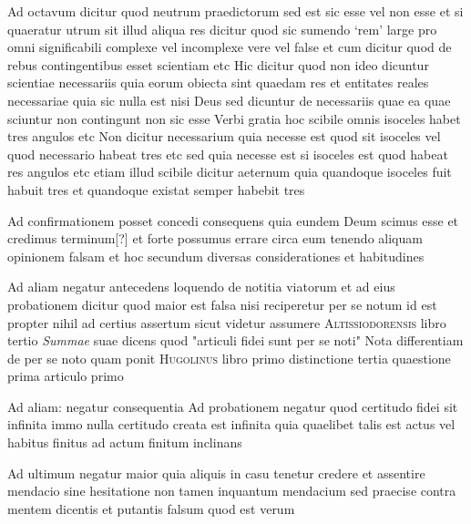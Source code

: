 \documentclass[twoside, openright]{article}
\newcommand{\name}[1]{\textsc{#1}}
\newcommand{\worktitle}[1]{\textit{#1}}
\begin{document}
        \pstart
        Ad octavum dicitur quod neutrum praedictorum sed est sic esse vel non esse et si quaeratur utrum sit illud aliqua res dicitur quod sic sumendo \enquote*{rem} large pro omni significabili complexe vel incomplexe vere vel false et cum dicitur quod de rebus contingentibus esset scientiam etc Hic dicitur quod non ideo dicuntur scientiae necessariis quia eorum obiecta sint quaedam res et entitates reales necessariae quia sic nulla est nisi Deus sed dicuntur de necessariis quae ea quae sciuntur non contingunt non sic esse Verbi gratia hoc scibile omnis isoceles habet tres angulos etc Non dicitur necessarium quia necesse est quod sit isoceles vel quod necessario habeat tres etc sed quia necesse est si isoceles est quod habeat res angulos etc etiam illud scibile dicitur aeternum quia quandoque isoceles fuit habuit tres et quandoque existat semper habebit tres
        \pend
     
        \pstart
        Ad confirmationem posset concedi consequens quia eundem Deum scimus esse et credimus terminum[?] et forte possumus errare circa eum tenendo aliquam opinionem falsam et hoc secundum diversas considerationes et habitudines
        \pend
     
        \pstart
        Ad aliam negatur antecedens loquendo de notitia viatorum et ad eius probationem dicitur quod maior est falsa nisi reciperetur per se notum id est propter nihil ad certius assertum sicut videtur assumere \name{Altissiodorensis} libro tertio \worktitle{Summae}\index[works]{} suae dicens quod "articuli fidei sunt per se noti" Nota differentiam de per se noto quam ponit \name{Hugolinus} libro primo distinctione tertia quaestione prima articulo primo
        \pend
     
        \pstart
        Ad aliam: negatur consequentia Ad probationem negatur quod certitudo fidei sit infinita immo nulla certitudo creata est infinita quia quaelibet talis est actus vel habitus finitus ad actum finitum inclinans 
        \pend
     
        \pstart
        Ad ultimum negatur maior quia aliquis in casu tenetur credere et assentire mendacio sine hesitatione non tamen inquantum mendacium sed praecise contra mentem dicentis et putantis falsum quod est verum 
        \pend
     
\end{document}
